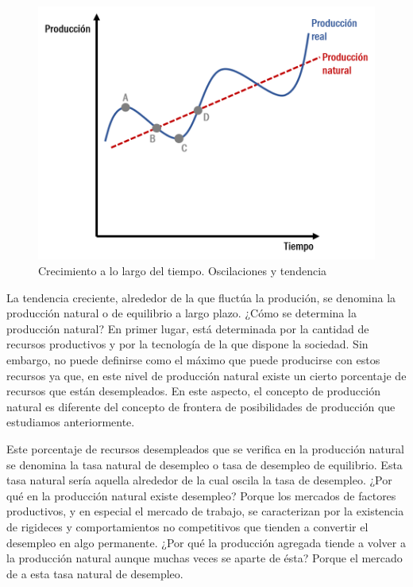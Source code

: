 \documentclass[
]{krantz}
\begin{document}
\begin{figure}

{\centering \includegraphics[width=0.85\linewidth]{images/16a-01} 

}

\caption{Crecimiento a lo largo del tiempo. Oscilaciones y tendencia}\label{fig:16a-01}
\end{figure}

La tendencia creciente, alrededor de la que ﬂuctúa la produción, se denomina la producción natural o de equilibrio a largo plazo. ¿Cómo se determina la producción natural? En primer lugar, está determinada por la cantidad de recursos productivos y por la tecnología de la que dispone la sociedad. Sin embargo, no puede deﬁnirse como el máximo que puede producirse con estos recursos ya que, en este nivel de producción natural existe un cierto porcentaje de recursos que están desempleados. En este aspecto, el concepto de producción natural es diferente del concepto de frontera de posibilidades de producción que estudiamos anteriormente.

Este porcentaje de recursos desempleados que se veriﬁca en la producción natural se denomina la tasa natural de desempleo o tasa de desempleo de equilibrio. Esta tasa natural sería aquella alrededor de la cual oscila la tasa de desempleo. ¿Por qué en la producción natural existe desempleo? Porque los mercados de factores productivos, y en especial el mercado de trabajo, se caracterizan por la existencia de rigideces y comportamientos no competitivos que tienden a convertir el desempleo en algo permanente. ¿Por qué la producción agregada tiende a volver a la producción natural aunque muchas veces se aparte de ésta? Porque el mercado de a esta tasa natural de desempleo.
\end{document}
